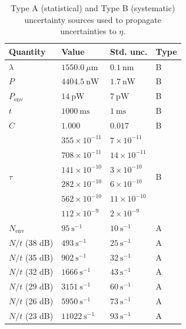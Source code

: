\begin{table}[h]
  \centering
  \begin{tabular}{llll}
    \toprule
    \textbf{Quantity} & \textbf{Value} & \textbf{Std. unc.} & \textbf{Type} \\
    \midrule
    $\lambda$ & $1550.0~\mu\text{m}$ & $0.1~\text{nm}$ & B \\
    $P$ & $4404.5~\text{nW}$ & $1.7~\text{nW}$ & B \\
    $P_{\mathrm{env}}$ & $14~\text{pW}$ &
    $7~\text{pW}$ & B \\
    $t$ & $1000~\text{ms}$ & $1~\text{ms}$ & B \\
    $C$ & $1.000$ & $0.017$ & B \\

    \multirow{6}{*}{$\tau$}
    & $355\times 10^{-11}$  & $7 \times 10^{-11} $  & \multirow{6}{*}{B} \\
    & $708\times 10^{-11}$ & $14 \times 10^{-11} $ & \\
    & $141 \times 10^{-10}$  & $3 \times 10^{-10} $ & \\
    & $282\times 10^{-10}$  & $6 \times 10^{-10} $ & \\
    & $562\times 10^{-10}$  & $11 \times 10^{-10} $  & \\
    & $112\times 10^{-9}$ & $2 \times 10^{-9} $ & \\

    \midrule
    $N_{\mathrm{env}}$ & $95~\text{s}^{-1}$ & $10~\text{s}^{-1}$ & A \\
    $N/t$ (38 dB) & $493~\text{s}^{-1}$ & $25~\text{s}^{-1}$ & A \\
    $N/t$ (35 dB) & $902~\text{s}^{-1}$ & $32~\text{s}^{-1}$ & A \\
    $N/t$ (32 dB) & $1666~\text{s}^{-1}$ & $43~\text{s}^{-1}$ & A \\
    $N/t$ (29 dB) & $3151~\text{s}^{-1}$ & $60~\text{s}^{-1}$ & A \\
    $N/t$ (26 dB) & $5950~\text{s}^{-1}$ & $73~\text{s}^{-1}$ & A \\
    $N/t$ (23 dB) & $11022~\text{s}^{-1}$ & $93~\text{s}^{-1}$ & A \\
    \bottomrule
  \end{tabular}
  \caption{Type A (statistical) and Type B (systematic) uncertainty
  sources used to propagate uncertainties to $\eta$.}
  \label{tab:eta_uncertainty_sources}
\end{table}

